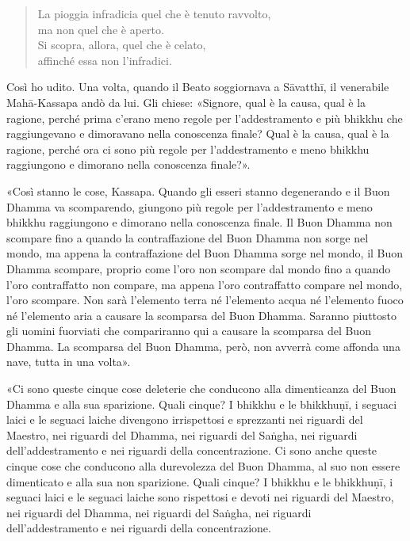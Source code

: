 \begin{quote}
La pioggia infradicia quel che è tenuto ravvolto, \\
ma non quel che è aperto. \\
Si scopra, allora, quel che è celato, \\
affinché essa non l’infradici.
\end{quote}


 Così ho udito. Una volta, quando il Beato soggiornava a
Sāvatthī, il venerabile Mahā-Kassapa andò da lui. Gli chiese: «Signore, qual è
la causa, qual è la ragione, perché prima c’erano meno regole per
l’addestramento e più bhikkhu che raggiungevano e dimoravano nella conoscenza
finale? Qual è la causa, qual è la ragione, perché ora ci sono più regole per
l’addestramento e meno bhikkhu raggiungono e dimorano nella conoscenza finale?».

«Così stanno le cose, Kassapa. Quando gli esseri stanno degenerando e il Buon
Dhamma va scomparendo, giungono più regole per l’addestramento e meno bhikkhu
raggiungono e dimorano nella conoscenza finale. Il Buon Dhamma non scompare fino
a quando la contraffazione del Buon Dhamma non sorge nel mondo, ma appena la
contraffazione del Buon Dhamma sorge nel mondo, il Buon Dhamma scompare, proprio
come l’oro non scompare dal mondo fino a quando l’oro contraffatto non compare,
ma appena l’oro contraffatto compare nel mondo, l’oro scompare. Non sarà
l’elemento terra né l’elemento acqua né l’elemento fuoco né l’elemento aria a
causare la scomparsa del Buon Dhamma. Saranno piuttosto gli uomini fuorviati che
compariranno qui a causare la scomparsa del Buon Dhamma. La scomparsa del Buon
Dhamma, però, non avverrà come affonda una nave, tutta in una volta».

«Ci sono queste cinque cose deleterie che conducono alla dimenticanza del Buon
Dhamma e alla sua sparizione. Quali cinque? I bhikkhu e le bhikkhuṇī, i seguaci
laici e le seguaci laiche divengono irrispettosi e sprezzanti nei riguardi del
Maestro, nei riguardi del Dhamma, nei riguardi del Saṅgha, nei riguardi
dell’addestramento e nei riguardi della concentrazione. Ci sono anche queste
cinque cose che conducono alla durevolezza del Buon Dhamma, al suo non essere
dimenticato e alla sua non sparizione. Quali cinque? I bhikkhu e le bhikkhuṇī, i
seguaci laici e le seguaci laiche sono rispettosi e devoti nei riguardi del
Maestro, nei riguardi del Dhamma, nei riguardi del Saṅgha, nei riguardi
dell’addestramento e nei riguardi della concentrazione.

